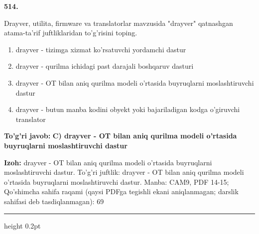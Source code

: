 \documentclass[10pt,a4paper]{article}
\begin{document}
{\bfseries\sffamily\color{ink} 514.}
\par
Drayver, utilita, firmware va translatorlar mavzusida "drayver" qatnashgan atama-ta'rif juftliklaridan to'g'risini toping.
\begin{enumerate}[label=\Alph*),leftmargin=9mm]
\item drayver - tizimga xizmat ko'rsatuvchi yordamchi dastur
\item drayver - qurilma ichidagi past darajali boshqaruv dasturi
\item drayver - OT bilan aniq qurilma modeli o'rtasida buyruqlarni moslashtiruvchi dastur
\item drayver - butun manba kodini obyekt yoki bajariladigan kodga o'giruvchi translator
\end{enumerate}
\begin{tcolorbox}[enhanced,breakable,colback=teal!4,colframe=teal!60!black,boxrule=0.45pt,arc=1.2mm,left=2.7mm,right=2.7mm,top=1.8mm,bottom=1.8mm,before skip=2mm,after skip=2mm]
{\bfseries\sffamily\color{teal}To'g'ri javob:} \textbf{C) drayver - OT bilan aniq qurilma modeli o'rtasida buyruqlarni moslashtiruvchi dastur}
\par\smallskip
{\bfseries Izoh:} drayver - OT bilan aniq qurilma modeli o'rtasida buyruqlarni moslashtiruvchi dastur. To'g'ri juftlik: drayver - OT bilan aniq qurilma modeli o'rtasida buyruqlarni moslashtiruvchi dastur. Manba: CAM9, PDF 14-15; Qo'shimcha sahifa raqami (qaysi PDFga tegishli ekani aniqlanmagan; darslik sahifasi deb tasdiqlanmagan): 69
\end{tcolorbox}
\vspace{2mm}\hrule height 0.2pt\vspace{3mm}
\end{document}
